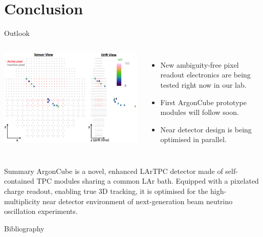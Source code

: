 \documentclass[]{beamer}
\newcommand*{\AC}{{ArgonCube}}
\newcommand*{\lar}{{LAr}}
\newcommand*{\lartpc}{{LArTPC}}
\begin{document}
\section{Conclusion}

\begin{frame}{Outlook}
	\begin{columns}[c]
		\centering
		\includegraphics[width=\textwidth]{larpix/example_track}
		\begin{itemize}
			\item New ambiguity-free pixel readout electronics are being tested right now in our lab.
			\item First \AC{} prototype modules will follow soon.
			\item Near detector design is being optimised in parallel.
		\end{itemize}
	\end{columns}
\end{frame}

\begin{frame}{Summary}
	\AC{} is a novel, enhanced \lartpc{} detector made of self-contained TPC modules sharing a common \lar{} bath.
	Equipped with a pixelated charge readout, enabling true 3D tracking, it is optimised for the high-multiplicity near detector environment of next-generation beam neutrino oscillation experiments.
\end{frame}

\begin{frame}[allowframebreaks]{Bibliography}
	\printbibliography
\end{frame}

\appendix
\end{document}
